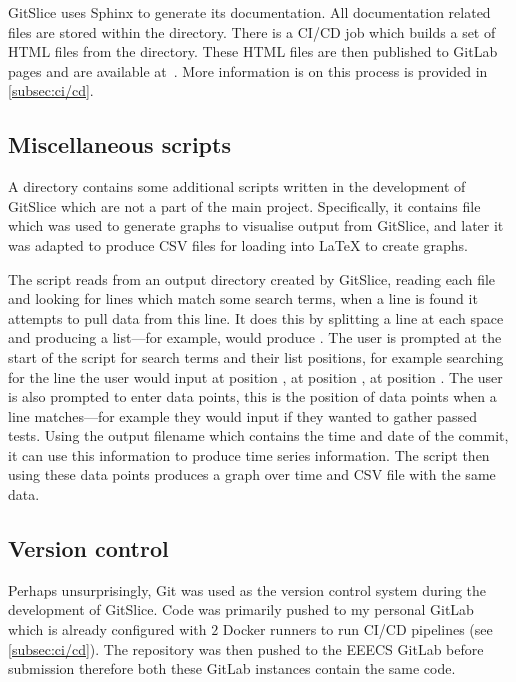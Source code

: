 \documentclass[11pt]{article}
\begin{document}
    GitSlice uses Sphinx to generate its documentation.
    All documentation related files are stored within the  directory.
    There is a CI/CD job which builds a set of HTML files from the  directory.
    These HTML files are then published to GitLab pages and are available at~\cite{docs_site}.
    More information is on this process is provided in \autoref{subsec:ci/cd}.

    \subsection{Miscellaneous scripts}
    \label{subsec:miscellaneous-scripts}

    A  directory contains some additional scripts written in the development of GitSlice which are not a part of the main project.
    Specifically, it contains  file which was used to generate graphs to visualise output from GitSlice, and later it was adapted to produce CSV files for loading into LaTeX to create graphs.

    The script reads from an output directory created by GitSlice, reading each file and looking for lines which match some search terms, when a line is found it attempts to pull data from this line.
    It does this by splitting a line at each space and producing a list---for example,  would produce .
    The user is prompted at the start of the script for search terms and their list positions, for example searching for the line  the user would input  at position ,  at position ,  at position .
    The user is also prompted to enter data points, this is the position of data points when a line matches---for example they would input  if they wanted to gather passed tests.
    Using the output filename which contains the time and date of the commit, it can use this information to produce time series information.
    The script then using these data points produces a graph over time and CSV file with the same data.

    \subsection{Version control}
    \label{subsec:version-control}

    Perhaps unsurprisingly, Git was used as the version control system during the development of GitSlice.
    Code was primarily pushed to my personal GitLab which is already configured with $2$ Docker runners to run CI/CD pipelines (see \autoref{subsec:ci/cd}).
    The repository was then pushed to the EEECS GitLab before submission therefore both these GitLab instances contain the same code.
\end{document}
